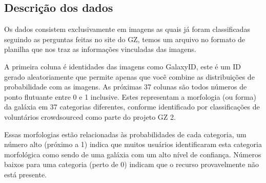 \subsection{Descrição dos dados} 

Os dados consistem exclusivamente em imagens as quais já foram classificadas seguindo as perguntas feitas no site do GZ, temos um arquivo no formato de planilha que nos traz as informações vinculadas das imagens.  

A primeira coluna é identidades das imagens como GalaxyID, este é um ID gerado aleatoriamente que permite apenas que você combine as distribuições de probabilidade com as imagens. As próximas 37 colunas são todos números de ponto flutuante entre 0 e 1 inclusive. Estes representam a morfologia (ou forma) da galáxia em 37 categorias diferentes, conforme identificado por classificações de voluntários crowdsourced como parte do projeto GZ 2.  

Essas morfologias estão relacionadas às probabilidades de cada categoria, um número alto (próximo a 1) indica que muitos usuários identificaram esta categoria morfológica como sendo de uma galáxia com um alto nível de confiança. Números baixos para uma categoria (perto de 0) indicam que o recurso provavelmente não está presente. 

 
